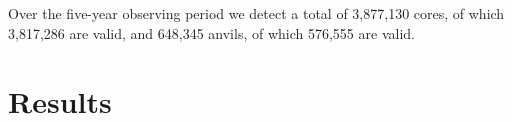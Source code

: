 Over the five-year observing period we detect a total of 3,877,130 cores, of which 3,817,286 are valid, and 648,345 anvils, of which 576,555 are valid.

\section{Results}




